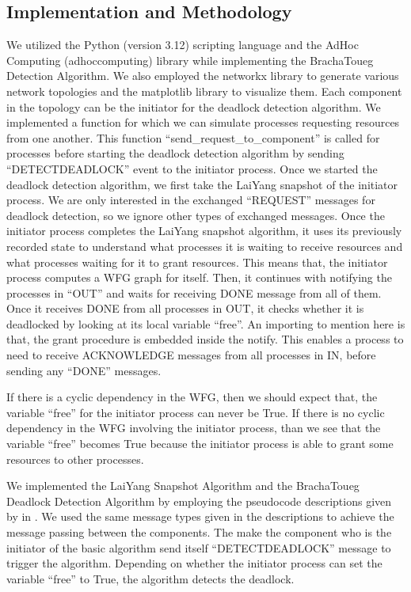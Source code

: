 \documentclass[letterpaper,10pt,english]{sphinxmanual}
\begin{document}
\subsection{Implementation and Methodology}
\label{\detokenize{docs/BrachaToueg/results:implementation-and-methodology}}
\sphinxAtStartPar
We utilized the Python (version 3.12) scripting language and the Ad\sphinxhyphen{}Hoc Computing (adhoccomputing) library while implementing the Bracha\sphinxhyphen{}Toueg Detection Algorithm. We also employed the networkx library to generate various network topologies and the matplotlib library to visualize them. Each component in the topology can be the initiator for the deadlock detection algorithm. We implemented a function for which we can simulate processes requesting resources from one another. This function “send\_request\_to\_component” is called for processes before starting the deadlock detection algorithm by sending “DETECTDEADLOCK” event to the initiator process. Once we started the deadlock detection algorithm, we first take the Lai\sphinxhyphen{}Yang snapshot of the initiator process. We are only interested in the exchanged “REQUEST” messages for deadlock detection, so we ignore other types of exchanged messages. Once the initiator process completes the Lai\sphinxhyphen{}Yang snapshot algorithm, it uses its previously recorded state to understand what processes it is waiting to receive resources and what processes waiting for it to grant resources. This means that, the initiator process computes a WFG graph for itself. Then, it continues with notifying the processes in “OUT” and waits for receiving DONE message from all of them. Once it receives DONE from all processes in OUT, it checks whether it is deadlocked by looking at its local variable “free”. An importing to mention here is that, the grant procedure is embedded inside the notify. This enables a process to need to receive ACKNOWLEDGE messages from all processes in IN, before sending any “DONE” messages.

\sphinxAtStartPar
If there is a cyclic dependency in the WFG, then we should expect that, the variable “free” for the initiator process can never be True. If there is no cyclic dependency in the WFG involving the initiator process, than we see that the variable “free” becomes True because the initiator process is able to grant some resources to other processes.

\sphinxAtStartPar
We implemented the Lai\sphinxhyphen{}Yang Snapshot Algorithm and the Bracha\sphinxhyphen{}Toueg Deadlock Detection Algorithm by employing the pseudocode descriptions given by in . We used the same message types given in the descriptions to achieve the message passing between the components. The make the component who is the initiator of the basic algorithm send itself “DETECTDEADLOCK” message to trigger the algorithm. Depending on whether the initiator process can set the variable “free” to True, the algorithm detects the deadlock.
\end{document}
